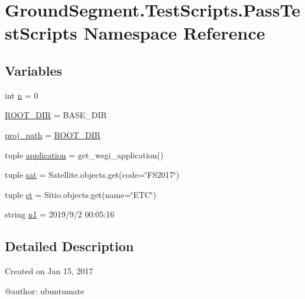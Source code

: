 \hypertarget{namespace_ground_segment_1_1_test_scripts_1_1_pass_test_scripts}{}\section{Ground\+Segment.\+Test\+Scripts.\+Pass\+Test\+Scripts Namespace Reference}
\label{namespace_ground_segment_1_1_test_scripts_1_1_pass_test_scripts}
\subsection*{Variables}
\begin{DoxyCompactItemize}
\item 
int \hyperlink{namespace_ground_segment_1_1_test_scripts_1_1_pass_test_scripts_a66d2d17525c7711372faa806bf13971b}{n} = 0
\item 
\hyperlink{namespace_ground_segment_1_1_test_scripts_1_1_pass_test_scripts_afa1dc4259563d460cb6edc96879ca90f}{R\+O\+O\+T\+\_\+\+D\+I\+R} = B\+A\+S\+E\+\_\+\+D\+I\+R
\item 
\hyperlink{namespace_ground_segment_1_1_test_scripts_1_1_pass_test_scripts_a96310377ba936a3a18993411f9dfce11}{proj\+\_\+path} = \hyperlink{namespace_ground_segment_1_1_test_scripts_1_1_pass_test_scripts_afa1dc4259563d460cb6edc96879ca90f}{R\+O\+O\+T\+\_\+\+D\+I\+R}
\item 
tuple \hyperlink{namespace_ground_segment_1_1_test_scripts_1_1_pass_test_scripts_a72d0cbf8031b7273f70f08836227ed45}{application} = get\+\_\+wsgi\+\_\+application()
\item 
tuple \hyperlink{namespace_ground_segment_1_1_test_scripts_1_1_pass_test_scripts_a13e60626bb4ad7f095912a6f4714beb9}{sat} = Satellite.\+objects.\+get(code=\char`\"{}F\+S2017\char`\"{})
\item 
tuple \hyperlink{namespace_ground_segment_1_1_test_scripts_1_1_pass_test_scripts_a5f5777af78deaca7195ed9bbe9f2bc21}{st} = Sitio.\+objects.\+get(name=\char`\"{}E\+T\+C\char`\"{})
\item 
string \hyperlink{namespace_ground_segment_1_1_test_scripts_1_1_pass_test_scripts_a1abcda4c86be68937428435d615f2a84}{n1} = \textquotesingle{}2019/9/2 00\+:05\+:16\textquotesingle{}
\end{DoxyCompactItemize}


\subsection{Detailed Description}
\begin{DoxyVerb}Created on Jan 15, 2017

@author: ubuntumate
\end{DoxyVerb}
 

